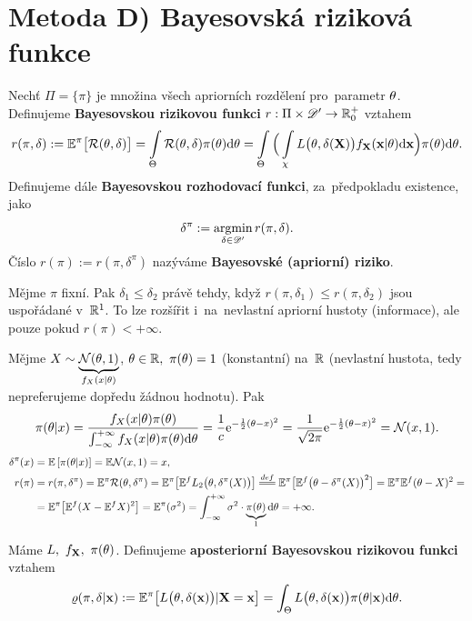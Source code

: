 \section{Metoda D) Bayesovská riziková funkce} 
\begin{define}
	Nechť $\Pi=\{ \pi\}$ je množina všech apriorních rozdělení pro~parametr $\theta$. Definujeme \textbf{Bayesovskou rizikovou funkci} $r:\Pi\times\mathscr{D}' \to\mathbb{R}_0^+$ vztahem
	$$ r(\pi,\delta):=\mathbb{E}^\pi\big[ \mathcal{R}(\theta,\delta) \big]=\int\limits_{\Theta}\mathcal{R}(\theta,\delta)\pi(\theta)\mathrm{d}\theta=\int\limits_{\Theta}\Big( \int\limits_{\chi}L\big(\theta,\delta(\textbf{X})\big)f_\textbf{X}(\textbf{x}|\theta)\mathrm{d}\textbf{x} \Big)\pi(\theta)\mathrm{d}\theta.$$
	Definujeme dále \textbf{Bayesovskou rozhodovací funkci}, za~předpokladu existence, jako $$\delta^\pi:=\mathop{\mathrm{argmin}}\limits_{\delta\in\mathscr{D} '}r(\pi,\delta).$$ 
	Číslo $r(\pi):=r(\pi,\delta^\pi)$ nazýváme \textbf{Bayesovské (apriorní) riziko}.  

\end{define}
\begin{remark}
	Mějme $\pi$ fixní. Pak $\delta_1\leq\delta_2$ právě tehdy, když $r(\pi,\delta_1)\leq r(\pi,\delta_2)$ jsou uspořádané v~$\mathbb{R}^1$. To lze rozšířit i~na~nevlastní apriorní hustoty (informace), ale pouze pokud $r(\pi)<+\infty$.
\end{remark}
\begin{example}
	Mějme $X\sim\underbrace{\mathcal{N}(\theta,1)}_{f_X(x|\theta)}$, $\theta\in\mathbb{R},~\pi(\theta)=1$ (konstantní) na~$\mathbb{R}$ (nevlastní hustota, tedy nepreferujeme dopředu žádnou hodnotu). Pak
	$$ \pi(\theta|x)=\frac{f_X(x|\theta) \pi(\theta)}{\int_{-\infty}^{+\infty}f_X(x|\theta) \pi(\theta)\mathrm{d}\theta}=\frac{1}{c}\mathrm{e}^{-\frac{1}{2}(\theta-x)^2}=\frac{1}{\sqrt{2\pi}}\mathrm{e}^{-\frac{1}{2}(\theta-x)^2}=\mathcal{N}(x,1).$$
	\[\begin{split}
	\delta^\pi(x)&=\EE{\pi(\t|x)}=\E\NN(x,1)=x,\\
	r(\pi)&= r(\pi,\delta^\pi)=\E^\pi \RF(\t,\delta^\pi)=\E^\pi\big[\E^f L_2\big(\t,\delta^\pi(X)\big)\big]\equal{def}\E^\pi\big[ \E^f\big(\t-\delta^\pi(X) \big)^2 \big]=\E^\pi\E^f(\t-X)^2=\\&=\E^\pi\big[ \E^f(X-\E^fX)^2 \big]=\E^\pi(\sigma^2)=\int_{-\infty}^{+\infty}\sigma^2\cdot \underbrace{\pi(\t)}_{1}\d\t=+\infty.
	\end{split}
	\]
\end{example}
\begin{define}
	Máme $L,~f_{\textbf{X}},~\pi(\theta)$. Definujeme \textbf{aposteriorní Bayesovskou rizikovou funkci} vztahem
	$$ \varrho(\pi,\delta|\textbf{x}):=\mathbb{E}^\pi\big[ L\big(\theta,\delta(\textbf{x})\big)|\textbf{X}=\textbf{x} \big]=\int_\Theta L\big(\theta,\delta(\textbf{x})\big)\pi(\theta|\textbf{x})\mathrm{d}\theta.$$ 
\end{define}

